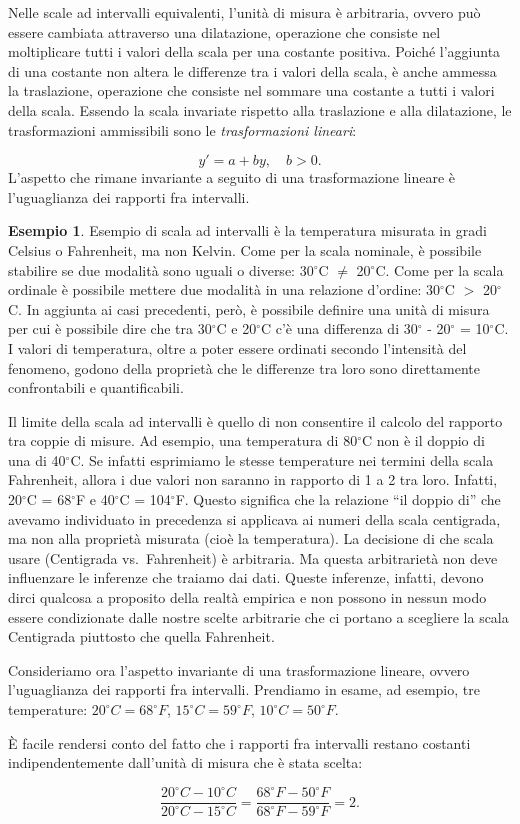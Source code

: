\documentclass[
  11pt,
]{krantz}
\theoremstyle{definition}
\theoremstyle{definition}
\newtheorem{example}{Esempio}[chapter]
\theoremstyle{definition}
\theoremstyle{definition}
\theoremstyle{remark}
\begin{document}
Nelle scale ad intervalli equivalenti, l'unità di misura è arbitraria, ovvero può essere cambiata attraverso una dilatazione, operazione che consiste nel moltiplicare tutti i valori della scala per una costante positiva. Poiché l'aggiunta di una costante non altera le differenze tra i valori della scala, è anche ammessa la traslazione, operazione che consiste nel sommare una costante a tutti i valori della scala. Essendo la scala invariate rispetto alla traslazione e alla dilatazione, le trasformazioni ammissibili sono le \emph{trasformazioni lineari}:

\[
y' = a + by, \quad b > 0.
\] L'aspetto che rimane invariante a seguito di una trasformazione lineare è l'uguaglianza dei rapporti fra intervalli.

\begin{example}
Esempio di scala ad intervalli è la temperatura misurata in gradi Celsius o Fahrenheit, ma non Kelvin. Come per la scala nominale, è possibile stabilire se due modalità sono uguali o diverse: 30\(^\circ\)C \(\neq\) 20\(^\circ\)C. Come per la scala ordinale è possibile mettere due modalità in una relazione d'ordine: 30\(^\circ\)C \(>\) 20\(^\circ\)C. In aggiunta ai casi precedenti, però, è possibile definire una unità di misura per cui è possibile dire che tra 30\(^\circ\)C e 20\(^\circ\)C c'è una differenza di 30\(^\circ\) - 20\(^\circ\) = 10\(^\circ\)C. I valori di temperatura, oltre a poter essere ordinati secondo l'intensità del fenomeno, godono della proprietà che le differenze tra loro sono direttamente confrontabili e quantificabili.

Il limite della scala ad intervalli è quello di non consentire il calcolo del rapporto tra coppie di misure. Ad esempio, una temperatura di 80\(^\circ\)C non è il doppio di una di 40\(^\circ\)C. Se infatti esprimiamo le stesse temperature nei termini della scala Fahrenheit, allora i due valori non saranno in rapporto di 1 a 2 tra loro. Infatti, 20\(^\circ\)C = 68\(^\circ\)F e 40\(^\circ\)C = 104\(^\circ\)F. Questo significa che la relazione ``il doppio di'' che avevamo individuato in precedenza si applicava ai numeri della scala centigrada, ma non alla proprietà misurata (cioè la temperatura). La decisione di che scala usare (Centigrada vs.~Fahrenheit) è arbitraria. Ma questa arbitrarietà non deve influenzare le inferenze che traiamo dai dati. Queste inferenze, infatti, devono dirci qualcosa a proposito della realtà empirica e non possono in nessun modo essere condizionate dalle nostre scelte arbitrarie che ci portano a scegliere la scala Centigrada piuttosto che quella Fahrenheit.

Consideriamo ora l'aspetto invariante di una trasformazione lineare, ovvero l'uguaglianza dei rapporti fra intervalli. Prendiamo in esame, ad esempio, tre temperature: \(20^\circ C = 68^\circ F\), \(15^\circ C = 59^\circ F\), \(10^\circ C = 50 ^\circ F\).

È facile rendersi conto del fatto che i rapporti fra intervalli restano costanti indipendentemente dall'unità di misura che è stata scelta:

\[
  \frac{20^\circ C - 10^\circ C}{20^\circ C - 15^\circ C} =
  \frac{68^\circ F - 50^\circ F}{68^\circ F-59^\circ F} = 2.
\]
\end{example}
\end{document}

